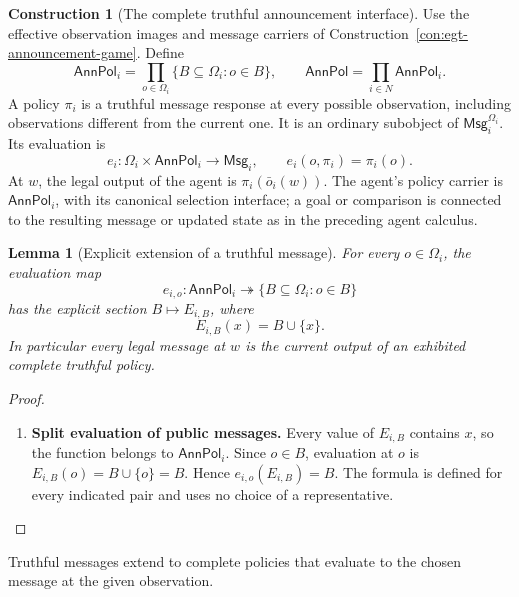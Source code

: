 \documentclass[11pt,a4paper]{article}
\numberwithin{equation}{section}
\newtheorem{lemma}[theorem]{Lemma}
\theoremstyle{definition}
\newtheorem{construction}[construction]{Construction}
\theoremstyle{remark}
\theoremstyle{plain}
\providecommand{\AnnPol}{\mathsf{AnnPol}}
\providecommand{\id}{\mathop{\mathrm{id}}}
\begin{document}
\begin{construction}[The complete truthful announcement interface]
\label{con:egt-complete-announcement-policies}
Use the effective observation images and message carriers of
Construction~\ref{con:egt-announcement-game}. Define
\[
 \mathsf{AnnPol}_i
 =\prod_{o\in\Omega_i}\{B\subseteq\Omega_i:o\in B\},
 \qquad
 \mathsf{AnnPol}=\prod_{i\in N}\mathsf{AnnPol}_i.
\]
A policy $\pi_i$ is a truthful message response at every possible
observation, including observations different from the current one.
It is an ordinary subobject of $\mathsf{Msg}_i^{\Omega_i}$. Its evaluation is
\[
 e_i:\Omega_i\times\mathsf{AnnPol}_i\to\mathsf{Msg}_i,
 \qquad e_i(o,\pi_i)=\pi_i(o).
\]
At $w$, the legal output of the agent is $\pi_i(\bar o_i(w))$.
The agent's policy carrier is $\mathsf{AnnPol}_i$, with its canonical
selection interface; a goal or comparison is connected to the resulting
message or updated state as in the preceding agent calculus.
\end{construction}

\begin{lemma}[Explicit extension of a truthful message]
\label{lem:egt-truthful-policy-extension}
\label{agt-lem-message-extension}
For every $o\in\Omega_i$, the evaluation map
\[
 e_{i,o}:\mathsf{AnnPol}_i\twoheadrightarrow
        \{B\subseteq\Omega_i:o\in B\}
\]
has the explicit section $B\mapsto E_{i,B}$, where
\[
 E_{i,B}(x)=B\cup\{x\}.
\]
In particular every legal message at $w$ is the current output of an
exhibited complete truthful policy.
\end{lemma}
\begin{proof}
\leavevmode
\begin{enumerate}[label=\textup{(\arabic*)},leftmargin=*,itemsep=4pt,topsep=3pt]
  \item \textbf{Split evaluation of public messages.} Every value of $E_{i,B}$ contains $x$, so the function belongs to
$\mathsf{AnnPol}_i$. Since $o\in B$, evaluation at $o$ is
$E_{i,B}(o)=B\cup\{o\}=B$. Hence $e_{i,o}(E_{i,B})=B$. The formula is defined
for every indicated pair and uses no choice of a representative.
\end{enumerate}
\end{proof}

\noindent Truthful messages extend to complete policies that evaluate to the chosen message at the given observation.
\begin{center}
\end{center}
\end{document}
